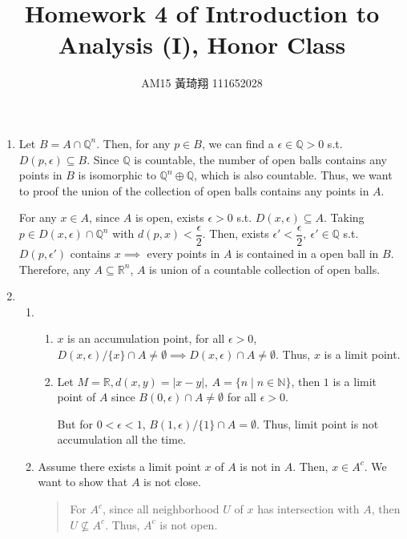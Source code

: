 \documentclass[12pt]{article}
\title{Homework 4 of Introduction to Analysis (I), Honor Class}
\author{AM15 黃琦翔 111652028}
\begin{document}
\maketitle
\begin{enumerate}
    \item Let $B = A \cap \mathbb{Q}^n$.
    Then, for any $p \in B$, we can find a $\epsilon\in \mathbb{Q} > 0$ s.t. $D(p, \epsilon) \subseteq B$.
    Since $\mathbb{Q}$ is countable, the number of open balls contains any points in $B$ is isomorphic to $\mathbb{Q}^n \oplus \mathbb{Q}$, which is also countable.
    Thus, we want to proof the union of the collection of open balls contains any points in $A$.

    For any $x \in A$, since $A$ is open, exists $\epsilon > 0$ s.t. $D(x, \epsilon) \subseteq A$. Taking $p \in D(x, \epsilon) \cap \mathbb{Q}^n$ with $d(p, x) < \dfrac{\epsilon}{2}$.
    Then, exists $\epsilon'< \dfrac{\epsilon}{2},\ \epsilon' \in \mathbb{Q}$ s.t. $D(p, \epsilon')$ contains $x\implies$ every points in $A$ is contained in a open ball in $B$.
    Therefore, any $A \subseteq \mathbb{R}^n$, $A$ is union of a countable collection of open balls.

    \item\begin{enumerate}
        \item\begin{enumerate}
            \item $x$ is an accumulation point, for all $\epsilon > 0$, $D(x, \epsilon)/\lbrace x \rbrace \cap A \neq \emptyset\implies D(x, \epsilon) \cap A \neq \emptyset$.
            Thus, $x$ is a limit point.
            \item Let $M = \mathbb{R}, d(x, y) = |x-y|,\ A = \lbrace n \mid n \in \mathbb{N}\rbrace$, then $1$ is a limit point of $A$ since $B(0, \epsilon) \cap A \neq \emptyset$ for all $\epsilon > 0$.
            
            But for $0 < \epsilon < 1$, $B(1, \epsilon)/\lbrace 1 \rbrace \cap A = \emptyset$. Thus, limit point is not accumulation all the time.
        \end{enumerate}
        \item Assume there exists a limit point $x$ of $A$ is not in $A$.
        Then, $x \in A^c$. We want to show that $A$ is not close.
        \begin{quote}
            For $A^c$, since all neighborhood $U$ of $x$ has intersection with $A$, then $U \nsubseteq A^c$. 
            Thus, $A^c$ is not open.
        \end{quote}


\end{enumerate}
\end{enumerate}
\end{document}
